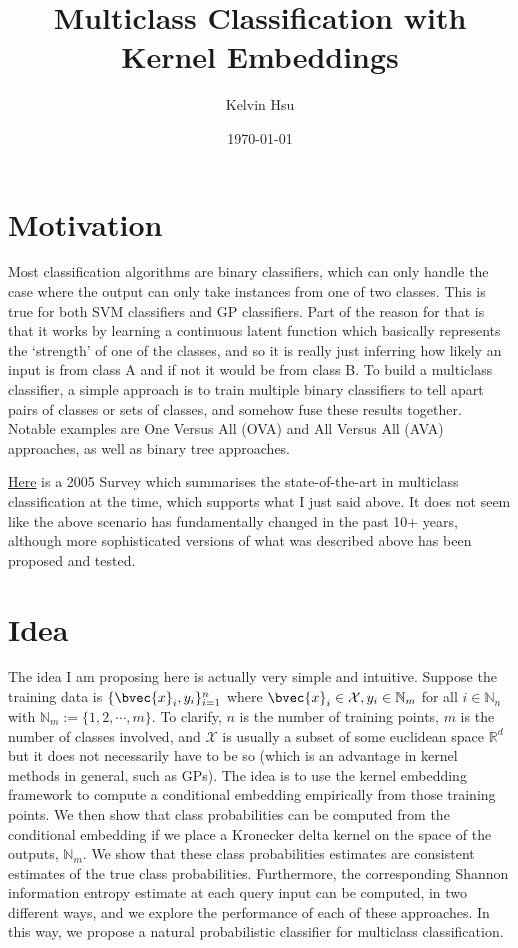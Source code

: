 \documentclass[a4paper, 12pt]{article}
\title{Multiclass Classification with Kernel Embeddings}
\author{Kelvin Hsu}
\date{\today}
\begin{document}
\maketitle

\section{Motivation}

	Most classification algorithms are binary classifiers, which can only handle the case where the output can only take instances from one of two classes. This is true for both SVM classifiers and GP classifiers. Part of the reason for that is that it works by learning a continuous latent function which basically represents the `strength' of one of the classes, and so it is really just inferring how likely an input is from class A and if not it would be from class B. To build a multiclass classifier, a simple approach is to train multiple binary classifiers to tell apart pairs of classes or sets of classes, and somehow fuse these results together. Notable examples are One Versus All (OVA) and All Versus All (AVA) approaches, as well as binary tree approaches.
	
	\href{http://www.vision.caltech.edu/malaa/publications/aly05multiclass.pdf}{Here} is a 2005 Survey which summarises the state-of-the-art in multiclass classification at the time, which supports what I just said above. It does not seem like the above scenario has fundamentally changed in the past 10+ years, although more sophisticated versions of what was described above has been proposed and tested.
	
\section{Idea}

	The idea I am proposing here is actually very simple and intuitive. Suppose the training data is $\{\bvec{x}_{i}, y_{i}\}_{i = 1}^{n}$ where $\bvec{x}_{i} \in \mathcal{X}, y_{i} \in \mathbb{N}_{m}$ for all $i \in \mathbb{N}_{n}$ with $\mathbb{N}_{m} := \{1, 2, \cdots, m\}$. To clarify, $n$ is the number of training points, $m$ is the number of classes involved, and $\mathcal{X}$ is usually a subset of some euclidean space $\mathbb{R}^{d}$ but it does not necessarily have to be so (which is an advantage in kernel methods in general, such as GPs). The idea is to use the kernel embedding framework to compute a conditional embedding empirically from those training points. We then show that class probabilities can be computed from the conditional embedding if we place a Kronecker delta kernel on the space of the outputs, $\mathbb{N}_{m}$. We show that these class probabilities estimates are consistent estimates of the true class probabilities. Furthermore, the corresponding Shannon information entropy estimate at each query input can be computed, in two different ways, and we explore the performance of each of these approaches. In this way, we propose a natural probabilistic classifier for multiclass classification.
	
\end{document}
